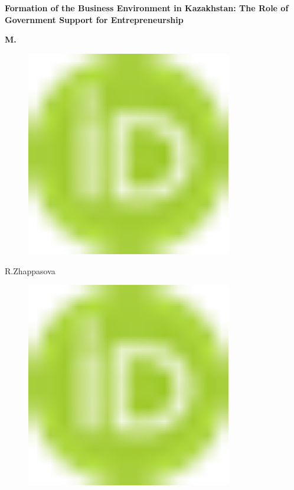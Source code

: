 
{\bfseries Formation of the Business Environment in Kazakhstan: The Role of
Government Support for Entrepreneurship}

{\bfseries M.
\begin{figure}[H]
	\centering
	\includegraphics[width=0.8\textwidth]{media/ekon/image1}
	\caption*{}
\end{figure}

R.Zhappasova}
\begin{figure}[H]
	\centering
	\includegraphics[width=0.8\textwidth]{media/ekon/image1}
	\caption*{}
\end{figure}

